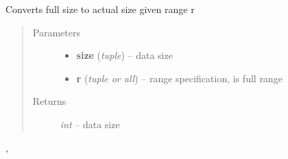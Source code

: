 \documentclass[letterpaper,10pt,english]{sphinxmanual}
\begin{document}
\begin{fulllineitems}
\label{api/ClearMap.IO:ClearMap.IO.IO.toDataSize}
Converts full size to actual size given range r
\begin{quote}\begin{description}
\item[{Parameters}] \leavevmode\begin{itemize}
\item {} 
\textbf{size} (\emph{tuple}) --
data size

\item {} 
\textbf{r} (\emph{tuple or all}) --
range specification,  is full range

\end{itemize}

\item[{Returns}] \leavevmode
\emph{int} --
data size

\end{description}\end{quote}




{\hyperref[api/ClearMap.IO:ClearMap.IO.IO.toDataRange]{\emph{}}}, {\hyperref[api/ClearMap.IO:ClearMap.IO.IO.dataSizeFromDataRange]{\emph{}}}



\end{fulllineitems}

\end{document}
